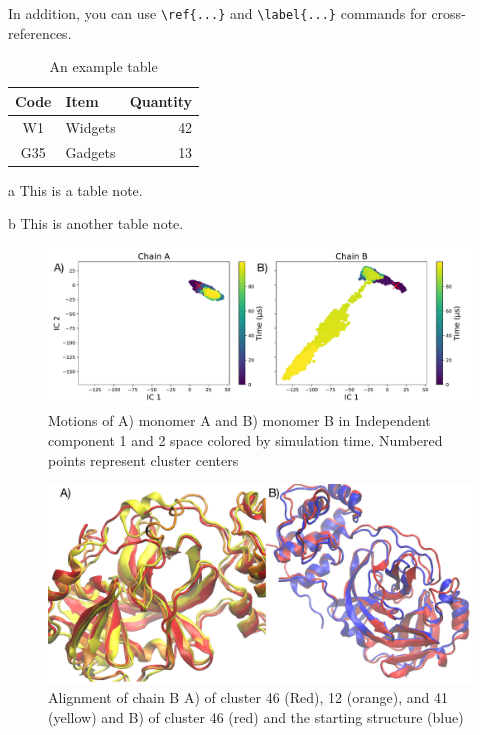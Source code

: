 \documentclass{biophys-new}
\begin{document}
In addition, you can use \verb|\ref{...}| and \verb|\label{...}| commands for cross-references.

\begin{table}[hbt!]
\caption{An example table}
\label{tab:widgets}
\centering

\begin{threeparttable}

\begin{tabular}{c l r}
\hline
Code & Item & Quantity \\\hline
W1 & Widgets\tnote{a} & 42 \\
G35 & Gadgets & 13\tnote{b} \\
\hline
\end{tabular}

\begin{tablenotes}
\item[a] This is a table note.
\item[b] This is another table note.
\end{tablenotes}

\end{threeparttable}

\end{table}

\begin{figure}[h]
\centering
\graphicspath{ {./figures/} }
\includegraphics[width=0.6\linewidth]{fig_1_fdiscolortime_ic2_label.pdf}
\caption{Motions of A) monomer A and B) monomer B in Independent component 1 and 2 space colored by simulation time. Numbered points represent cluster centers}
\label{fig:view}
\end{figure}

\begin{figure}[h]
\graphicspath{ {./figures/} }
\centering
\includegraphics[width=0.6\linewidth]{fig2_IC1_align.pdf}
\caption{Alignment of chain B A) of cluster 46 (Red), 12 (orange), and 41 (yellow) and B) of cluster 46 (red) and the starting structure (blue)}
\label{fig:view}
\end{figure}
\end{document}
